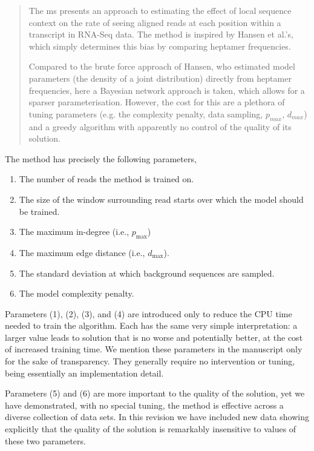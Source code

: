 \documentclass{article}
\begin{document}
\begin{quote}
The ms presents an approach to estimating the effect of local sequence
context on the rate of seeing aligned reads at each position within a
transcript in RNA-Seq data. The method is inspired by Hansen et al.'s,
which simply determines this bias by comparing heptamer frequencies.

Compared to the brute force approach of Hansen, who estimated model
parameters (the density of a joint distribution) directly from
heptamer frequencies, here a Bayesian network approach is taken, which
allows for a sparser parameterisation. However, the cost for this are
a plethora of tuning parameters (e.g. the complexity penalty, data
sampling, $p_{max}$, $d_{max}$) and a greedy algorithm with apparently no
control of the quality of its solution.
\end{quote}

The method has precisely the following parameters,
\begin{enumerate}
\item The number of reads the method is trained on.
\item The size of the window surrounding read starts over which the model should
be trained.
\item The maximum in-degree (i.e., $p_{\text{max}}$)
\item The maximum edge distance (i.e., $d_{\text{max}}$).
\item The standard deviation at which background sequences are sampled.
\item The model complexity penalty.
\end{enumerate}

Parameters (1), (2), (3), and (4) are introduced only to reduce the CPU time
needed to train the algorithm. Each has the same very simple interpretation: a
larger value leads to solution that is no worse and potentially better, at the
cost of increased training time.  We mention these parameters in the manuscript
only for the sake of transparency.  They generally require no intervention or
tuning, being essentially an implementation detail. 

Parameters (5) and (6) are more important to the quality of the solution, yet we
have demonstrated, with no special tuning, the method is effective across a
diverse collection of data sets. In this revision we have included new data
showing explicitly that the quality of the solution is remarkably insensitive to
values of these two parameters.
\end{document}
